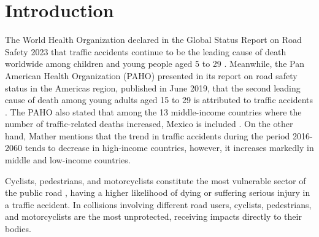 \documentclass[preprint,12pt]{elsarticle}
\begin{document}

\section{Introduction}
\label{Changes}



The World Health Organization declared in the Global Status Report on Road Safety 2023 that traffic accidents continue to be the leading cause of death worldwide among children and young people aged 5 to 29 \cite{who_global_2023}. Meanwhile, the Pan American Health Organization (PAHO) presented in its report on road safety status in the Americas region, published in June 2019, that the second leading cause of death among young adults aged 15 to 29 is attributed to traffic accidents \cite{pan_american_health_organization_status_2019}. The PAHO also stated that among the 13 middle-income countries where the number of traffic-related deaths increased, Mexico is included \cite{pan_american_health_organization_status_2019}. On the other hand, Mather \cite{mathers_updated_nodate} mentions that the trend in traffic accidents during the period 2016-2060 tends to decrease in high-income countries, however, it increases markedly in middle and low-income countries.

Cyclists, pedestrians, and motorcyclists constitute the most vulnerable sector of the public road \cite{who_global_2023}, having a higher likelihood of dying or suffering serious injury in a traffic accident. In collisions involving different road users, cyclists, pedestrians, and motorcyclists are the most unprotected, receiving impacts directly to their bodies.
\end{document}
